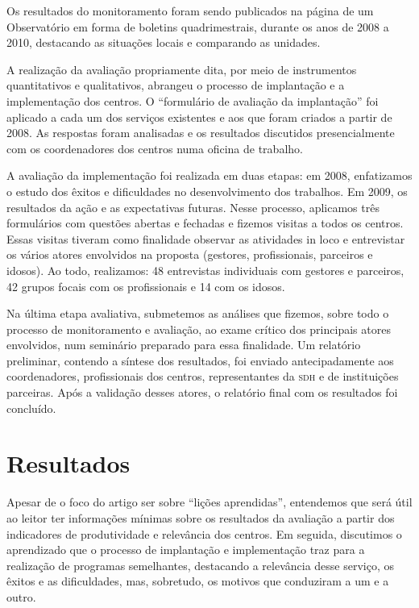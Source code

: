 \documentclass{article}
\begin{document}
Os resultados do monitoramento foram sendo publicados na página de um
Observatório em forma de boletins quadrimestrais, durante os anos de 2008 a
2010, destacando as situações locais e comparando as unidades.

A realização da avaliação propriamente dita, por meio de instrumentos
quantitativos e qualitativos, abrangeu o processo de implantação e a
implementação dos centros. O “formulário de avaliação da implantação” foi
aplicado a cada um dos serviços existentes e aos que foram criados a partir de
2008. As respostas foram analisadas e os resultados discutidos presencialmente
com os coordenadores dos centros numa oficina de trabalho.

A avaliação da implementação foi realizada em duas etapas: em 2008, enfatizamos
o estudo dos êxitos e dificuldades no desenvolvimento dos trabalhos. Em 2009, os
resultados da ação e as expectativas futuras. Nesse processo, aplicamos três
formulários com questões abertas e fechadas e fizemos visitas a todos os
centros. Essas visitas tiveram como finalidade observar as atividades in loco e
entrevistar os vários atores envolvidos na proposta (gestores, profissionais,
parceiros e idosos). Ao todo, realizamos: 48 entrevistas individuais com
gestores e parceiros, 42 grupos focais com os profissionais e 14 com os idosos.

Na última etapa avaliativa, submetemos as análises que fizemos, sobre todo o
processo de monitoramento e avaliação, ao exame crítico dos principais atores
envolvidos, num seminário preparado para essa finalidade. Um relatório
preliminar, contendo a síntese dos resultados, foi enviado antecipadamente aos
coordenadores, profissionais dos centros, representantes da \textsc{sdh} e de
instituições parceiras. Após a validação desses atores, o relatório final com os
resultados foi concluído.

\section{Resultados}

Apesar de o foco do artigo ser sobre “lições aprendidas”, entendemos que será
útil ao leitor ter informações mínimas sobre os resultados da avaliação a partir
dos indicadores de produtividade e relevância dos centros. Em seguida,
discutimos o aprendizado que o processo de implantação e implementação traz para
a realização de programas semelhantes, destacando a relevância desse serviço, os
êxitos e as dificuldades, mas, sobretudo, os motivos que conduziram a um e a
outro.
\end{document}
